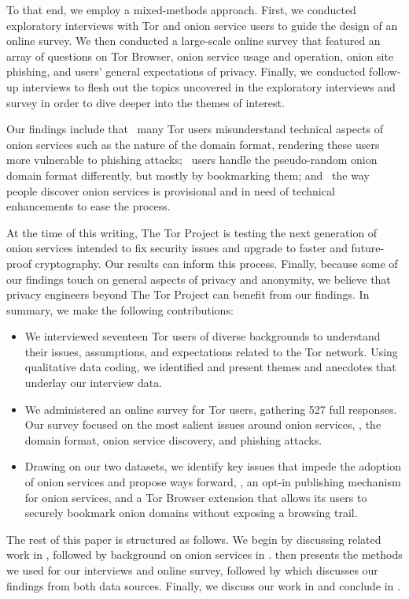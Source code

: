 To that end, we employ a mixed-methods approach. First, we conducted exploratory interviews with Tor and onion service users to guide the design of an online survey. We then conducted a large-scale online survey that featured an array of questions on Tor Browser, onion service usage and operation, onion site
phishing, and users' general expectations of privacy. Finally, we conducted follow-up interviews to flesh out the topics uncovered in the exploratory interviews and survey in order to dive deeper into the themes of interest.

Our findings include that \first~many Tor users misunderstand technical aspects
of onion services such as the nature of the domain format, rendering these users
more vulnerable to phishing attacks; \second~users handle the pseudo-random
onion domain format differently, but mostly by bookmarking them; and \third~the
way people discover onion services is provisional and in need of technical
enhancements to ease the process.

At the time of this writing, The Tor Project is testing the next generation of
onion services intended to fix security issues and upgrade to faster and
future-proof cryptography.  Our results can inform this process.
Finally, because some of our findings touch on general aspects of privacy and
anonymity, we believe that privacy engineers beyond The Tor Project can benefit
from our findings.  In summary, we make the following contributions:

\begin{itemize}
    \item We interviewed seventeen Tor users of diverse backgrounds to
        understand their issues, assumptions, and expectations related to the
        Tor network.  Using qualitative data coding, we identified and present
        themes and anecdotes that underlay our interview data.

    \item We administered an online survey for Tor users, gathering 527 full
        responses.  Our survey focused on the most salient issues around onion
        services, \ie, the domain format, onion service discovery, and phishing
        attacks.

    \item Drawing on our two datasets, we identify key issues that impede the
        adoption of onion services and propose ways forward, \eg, an opt-in
        publishing mechanism for onion services, and a Tor Browser extension
        that allows its users to securely bookmark onion domains without
        exposing a browsing trail.
\end{itemize}

The rest of this paper is structured as follows.  We begin by discussing related
work in , followed by background on onion services in
.   then presents the methods we used for
our interviews and online survey, followed by  which discusses
our findings from both data sources.  Finally, we discuss our work in
 and conclude in .
